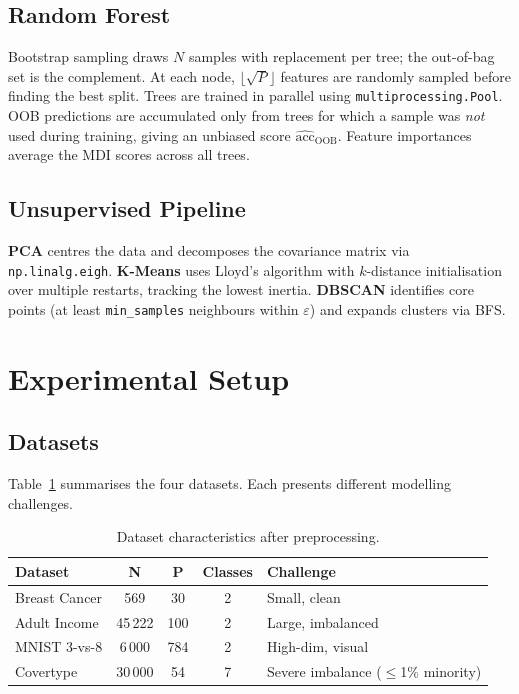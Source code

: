 \documentclass[conference]{IEEEtran}
\begin{document}
\subsection{Random Forest}
Bootstrap sampling draws $N$ samples with replacement per tree;
the out-of-bag set is the complement.  At each node, $\lfloor\sqrt{P}\rfloor$
features are randomly sampled before finding the best split.  Trees
are trained in parallel using \texttt{multiprocessing.Pool}.
OOB predictions are accumulated only from trees for which a sample
was \emph{not} used during training, giving an unbiased score
$\hat{\text{acc}}_\text{OOB}$.  Feature importances average the MDI
scores across all trees.

\subsection{Unsupervised Pipeline}
\textbf{PCA} centres the data and decomposes the covariance matrix
via \texttt{np.linalg.eigh}.  \textbf{K-Means} uses Lloyd's algorithm
with $k$-distance initialisation over multiple restarts, tracking the
lowest inertia.  \textbf{DBSCAN} identifies core points (at least
\texttt{min\_samples} neighbours within $\varepsilon$) and expands
clusters via BFS.

\section{Experimental Setup}
\label{sec:experiments}

\subsection{Datasets}
Table~\ref{tab:datasets} summarises the four datasets.  Each
presents different modelling challenges.

\begin{table}[h]
\centering
\caption{Dataset characteristics after preprocessing.}
\label{tab:datasets}
\setlength{\tabcolsep}{4pt}
\begin{tabular}{lcccl}
\toprule
\textbf{Dataset} & \textbf{N} & \textbf{P} & \textbf{Classes} & \textbf{Challenge}\\
\midrule
Breast Cancer & 569 & 30 & 2 & Small, clean\\
Adult Income & 45\,222 & 100 & 2 & Large, imbalanced\\
MNIST 3-vs-8 & 6\,000 & 784 & 2 & High-dim, visual\\
Covertype & 30\,000 & 54 & 7 & Severe imbalance ($\le$1\% minority)\\
\bottomrule
\end{tabular}
\end{table}
\end{document}
